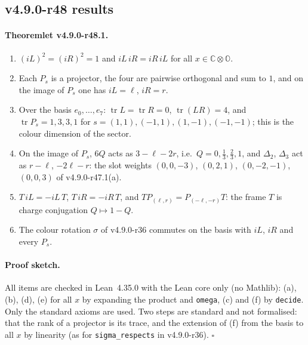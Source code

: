 \subsection*{v4.9.0-r48 results}
\label{subsec:v490-r48-results}

\paragraph{Theoremlet v4.9.0-r48.1.}
\begin{enumerate}[leftmargin=2em]
\item[(a)] \((iL)^2=(iR)^2=1\) and \(iL\,iR=iR\,iL\) for all \(x\in\mathbb C\otimes\mathbb O\).
\item[(b)] Each \(P_s\) is a projector, the four are pairwise orthogonal and sum to \(1\), and on the image of \(P_s\) one has \(iL=\ell\),
\(iR=r\).
\item[(c)] Over the basis \(e_0,\dots,e_7\): \(\operatorname{tr}L=\operatorname{tr}R=0\), \(\operatorname{tr}(LR)=4\), and
\(\operatorname{tr}P_s=1,3,3,1\) for \(s=(1,1),(-1,1),(1,-1),(-1,-1)\); this is the colour dimension of the sector.
\item[(d)] On the image of \(P_s\), \(6Q\) acts as \(3-\ell-2r\), i.e.\ \(Q=0,\tfrac13,\tfrac23,1\), and \(\Delta_2\), \(\Delta_3\) act as
\(r-\ell\), \(-2\ell-r\): the slot weights \((0,0,-3)\), \((0,2,1)\), \((0,-2,-1)\), \((0,0,3)\) of v4.9.0-r47.1(a).
\item[(e)] \(T\,iL=-iL\,T\), \(T\,iR=-iR\,T\), and \(T P_{(\ell,r)}=P_{(-\ell,-r)}T\): the frame \(T\) is charge conjugation \(Q\mapsto1-Q\).
\item[(f)] The colour rotation \(\sigma\) of v4.9.0-r36 commutes on the basis with \(iL\), \(iR\) and every \(P_s\).
\end{enumerate}

\paragraph{Proof sketch.}
All items are checked in Lean~4.35.0 with the Lean core only (no Mathlib): (a), (b), (d), (e) for all \(x\) by expanding the product and
\texttt{omega}, (c) and (f) by \texttt{decide}.  Only the standard axioms are used.  Two steps are standard and not formalised: that the rank
of a projector is its trace, and the extension of (f) from the basis to all \(x\) by linearity (as for \texttt{sigma\_respects} in
v4.9.0-r36).  \(\square\)

